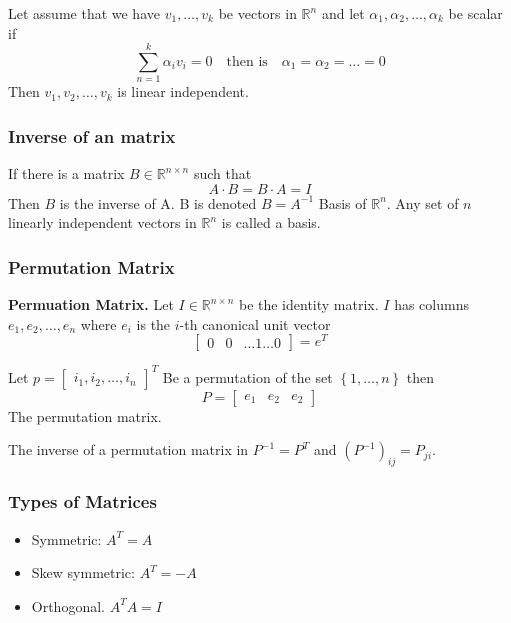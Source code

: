 \documentclass{article}
\theoremstyle{remark}
\begin{document}
Let assume that we have $v_{1}, \ldots, v_{k}$ be vectors in $\mathbb{R}^{n}$ and let $\alpha_1, \alpha_2, \ldots , \alpha_{k}$ be scalar if \[
\sum_{n=1}^{k} \alpha_i v_i = 0 \quad \text{then is} \quad \alpha_1=\alpha_2 = \ldots = 0   
\] 
Then $v_1, v_2, \ldots, v_{k}$ is linear independent. 

\subsubsection{Inverse of an matrix}%
\label{ssub:inverse_of_an_ntimes_n_matrix}

If there is a matrix $B \in \mathbb{R}^{n\times n }$ such that \[
A\cdot B= B\cdot A = I
\] Then $B$ is the inverse of A.
B is denoted $B = A ^{-1}$ 
Basis of $\mathbb{R}^{n}$. Any set of $n$ linearly independent vectors in $\mathbb{R}^{n}$ is called a basis. \par

\subsubsection{Permutation Matrix}%
\label{ssub:permutation_matrix}


\textbf{Permuation Matrix.} Let $I \in \mathbb{R}^{n\times n }$ be the identity matrix. $I$ has columns $e_1, e_2, \ldots , e_n$ where $e_i$ is the $i$-th canonical unit vector \[
\begin{bmatrix} 
  0 & 0 & \ldots 1 \ldots 0 
\end{bmatrix} 
= e^{T}
\] 


Let $p = \begin{bmatrix} 
i_1, i_2, \ldots, i_n
\end{bmatrix}^{T} $ 
Be a permutation of the set $\left\{ 1, \ldots, n \right\}$ then \[
P = \begin{bmatrix} 
  e_1 & e_2 & e_2 
\end{bmatrix} 
\] 
The permutation matrix. 


The inverse of a permutation matrix in $P^{-1} = P^{T}$ and $\left( P^{-1} \right)_{ij} = P_{ji}$.

\subsubsection{Types of Matrices}%
\label{ssub:types_of_matrices}

\begin{itemize}
  \item Symmetric: $A^{T} = A$
  \item Skew symmetric: $A^{T} = -A$
  \item Orthogonal. $A^{T} A = I$
\end{itemize}
\end{document}
